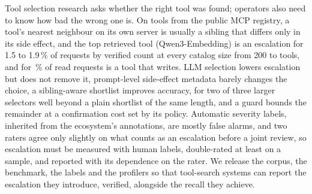 Tool selection research asks whether the right tool was found; operators also need to know how
bad the wrong one is. On \NumCatTools{} tools from the public MCP registry, a tool's nearest neighbour on its own server is usually a sibling
that differs only in its side effect, and the top
retrieved tool (Qwen3-Embedding) is an escalation for 1.5 to 1.9\,\% of requests by verified count at every catalog
size from 200 to \NumPoolTools{} tools, and for \RWRetRate\,\% of read requests is a tool that writes. LLM selection lowers escalation but does not remove it, prompt-level side-effect metadata barely
changes the choice, a sibling-aware shortlist improves accuracy, for two of three larger selectors well beyond a plain shortlist of the same length, and a guard bounds the remainder at a
confirmation cost set by its policy. Automatic severity labels, inherited from the ecosystem's
annotations, are mostly false alarms, and two raters
agree only slightly on what counts as an escalation before a joint review, so escalation must be measured with
human labels, double-rated at least on a sample, and reported with its dependence on the rater. We release the corpus, the benchmark, the labels and
the profilers so that tool-search systems can report the escalation they introduce, verified,
alongside the recall they achieve.
